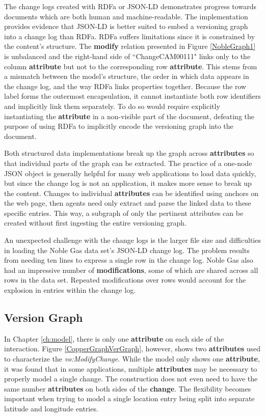 The change logs created with RDFa or JSON-LD demonstrates progress towards documents which are both human and machine-readable.
The implementation provides evidence that JSON-LD is better suited to embed a versioning graph into a change log than RDFa.
RDFa suffers limitations since it is constrained by the content's structure.
The \textbf{modify} relation presented in Figure \ref{NobleGraph1} is unbalanced and the right-hand side of ``ChangeCAM00111" links only to the column \textbf{attribute} but not to the corresponding row \textbf{attribute}.
This stems from a mismatch between the model's structure, the order in which data appears in the change log, and the way RDFa links properties together.
Because the row label forms the outermost encapsulation, it cannot instantiate both row identifiers and implicitly link them separately.
To do so would require explicitly instantiating the \textbf{attribute} in a non-visible part of the document, defeating the purpose of using RDFa to implicitly encode the versioning graph into the document.

Both structured data implementations break up the graph across \textbf{attributes} so that individual parts of the graph can be extracted.
The practice of a one-node JSON object is generally helpful for many web applications to load data quickly, but since the change log is not an application, it makes more sense to break up the content.
Changes to individual \textbf{attributes} can be identified using anchors on the web page, then agents need only extract and parse the linked data to these specific entries.
This way, a subgraph of only the pertinent attributes can be created without first ingesting the entire versioning graph.

An unexpected challenge with the change logs is the larger file size and difficulties in loading the Noble Gas data set's JSON-LD change log.
The problem results from needing ten lines to express a single row in the change log.
Noble Gas also had an impressive number of \textbf{modifications}, some of which are shared across all rows in the data set.
Repeated modifications over rows would account for the explosion in entries within the change log.

\subsection{Version Graph}

In Chapter \ref{ch:model}, there is only one \textbf{attribute} on each side of the interaction.
Figure \ref{CopperGraphVerGraph}, however, shows two \textbf{attributes} used to characterize the \textit{vo:ModifyChange}.
While the model only shows one \textbf{attribute}, it was found that in some applications, multiple \textbf{attributes} may be necessary to properly model a single change.
The construction does not even need to have the same number \textbf{attributes} on both sides of the \textbf{change}.
The flexibility becomes important when trying to model a single location entry being split into separate latitude and longitude entries.


